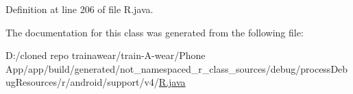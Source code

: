 Definition at line 206 of file R.\+java.



The documentation for this class was generated from the following file\+:\begin{DoxyCompactItemize}
\item 
D\+:/cloned repo trainawear/train-\/\+A-\/wear/\+Phone App/app/build/generated/not\+\_\+namespaced\+\_\+r\+\_\+class\+\_\+sources/debug/process\+Debug\+Resources/r/android/support/v4/\mbox{\hyperlink{process_debug_resources_2r_2android_2support_2v4_2_r_8java}{R.\+java}}\end{DoxyCompactItemize}
